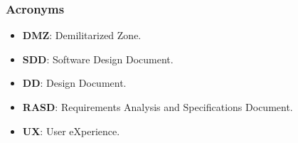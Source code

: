 \subsubsection{Acronyms}

\begin{itemize}
	\item \textbf{DMZ}: Demilitarized Zone.
	\item \textbf{SDD}: Software Design Document.
	\item \textbf{DD}: Design Document.
	\item \textbf{RASD}: Requirements Analysis and Specifications Document.
	\item \textbf{UX}: User eXperience.
\end{itemize}
